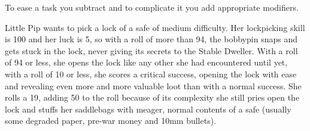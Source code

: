 To ease a task you subtract and to complicate it you add appropriate modifiers.
\begin{Example}
Little Pip wants to pick a lock of a safe of medium difficulty. Her lockpicking skill is 100 and her luck is 5, so with a roll of more than 94, the bobbypin snaps and gets stuck in the lock, never giving its secrets to the Stable Dweller. With a roll of 94 or less, she opens the lock like any other she had encountered until yet, with a roll of 10 or less, she scores a critical success, opening the lock with ease and revealing even more and more valuable loot than with a normal success. She rolls a 19, adding 50 to the roll because of its complexity she still pries open the lock and stuffs her saddlebags with meager, normal contents of a safe (usually some degraded paper, pre-war money and 10mm bullets).
\end{Example}